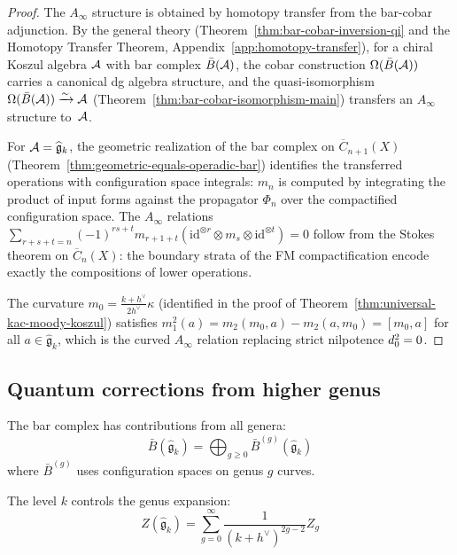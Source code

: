 \begin{proof}
The $A_\infty$ structure is obtained by homotopy transfer from the bar-cobar adjunction.  By the general theory (Theorem~\ref{thm:bar-cobar-inversion-qi} and the Homotopy Transfer Theorem, Appendix~\ref{app:homotopy-transfer}), for a chiral Koszul algebra $\mathcal{A}$ with bar complex $\bar{B}(\mathcal{A})$, the cobar construction $\Omega(\bar{B}(\mathcal{A}))$ carries a canonical dg algebra structure, and the quasi-isomorphism $\Omega(\bar{B}(\mathcal{A})) \xrightarrow{\sim} \mathcal{A}$ (Theorem~\ref{thm:bar-cobar-isomorphism-main}) transfers an $A_\infty$ structure to~$\mathcal{A}$.

For $\mathcal{A} = \widehat{\mathfrak{g}}_k$, the geometric realization of the bar complex on $\overline{C}_{n+1}(X)$ (Theorem~\ref{thm:geometric-equals-operadic-bar}) identifies the transferred operations with configuration space integrals: $m_n$ is computed by integrating the product of input forms against the propagator $\Phi_n$ over the compactified configuration space.  The $A_\infty$ relations $\sum_{r+s+t=n}(-1)^{rs+t} m_{r+1+t}(\mathrm{id}^{\otimes r} \otimes m_s \otimes \mathrm{id}^{\otimes t}) = 0$ follow from the Stokes theorem on $\overline{C}_n(X)$: the boundary strata of the FM compactification encode exactly the compositions of lower operations.

The curvature $m_0 = \frac{k+h^\vee}{2h^\vee}\kappa$ (identified in the proof of Theorem~\ref{thm:universal-kac-moody-koszul}) satisfies $m_1^2(a) = m_2(m_0, a) - m_2(a, m_0) = [m_0, a]$ for all $a \in \widehat{\mathfrak{g}}_k$, which is the curved $A_\infty$ relation replacing strict nilpotence $d_0^2 = 0$.
\end{proof}

\subsection{Quantum corrections from higher genus}

\begin{remark}
The bar complex has contributions from all genera:
\begin{equation}
\bar{B}(\widehat{\mathfrak{g}}_k) = \bigoplus_{g \geq 0} \bar{B}^{(g)}(\widehat{\mathfrak{g}}_k)
\end{equation}
where $\bar{B}^{(g)}$ uses configuration spaces on genus $g$ curves.

The level $k$ controls the genus expansion:
\begin{equation}
Z(\widehat{\mathfrak{g}}_k) = \sum_{g=0}^\infty \frac{1}{(k+h^\vee)^{2g-2}} Z_g
\end{equation}
\end{remark}

